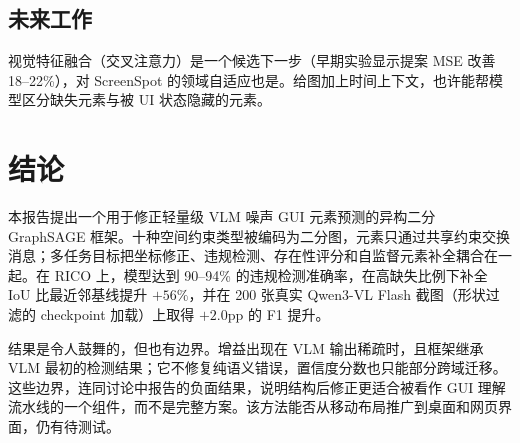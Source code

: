 \documentclass[11pt, letterpaper]{ctexart}
\begin{document}
\subsection{未来工作}
视觉特征融合（交叉注意力）是一个候选下一步（早期实验显示提案 MSE 改善 18--22\%），对 ScreenSpot 的领域自适应也是。给图加上时间上下文，也许能帮模型区分缺失元素与被 UI 状态隐藏的元素。

\section{结论}
本报告提出一个用于修正轻量级 VLM 噪声 GUI 元素预测的异构二分 GraphSAGE 框架。十种空间约束类型被编码为二分图，元素只通过共享约束交换消息；多任务目标把坐标修正、违规检测、存在性评分和自监督元素补全耦合在一起。在 RICO 上，模型达到 90--94\% 的违规检测准确率，在高缺失比例下补全 IoU 比最近邻基线提升 $+56\%$，并在 200 张真实 Qwen3-VL Flash 截图（形状过滤的 checkpoint 加载）上取得 $+2.0$pp 的 F1 提升。

结果是令人鼓舞的，但也有边界。增益出现在 VLM 输出稀疏时，且框架继承 VLM 最初的检测结果；它不修复纯语义错误，置信度分数也只能部分跨域迁移。这些边界，连同讨论中报告的负面结果，说明结构后修正更适合被看作 GUI 理解流水线的一个组件，而不是完整方案。该方法能否从移动布局推广到桌面和网页界面，仍有待测试。

\clearpage


\end{document}
